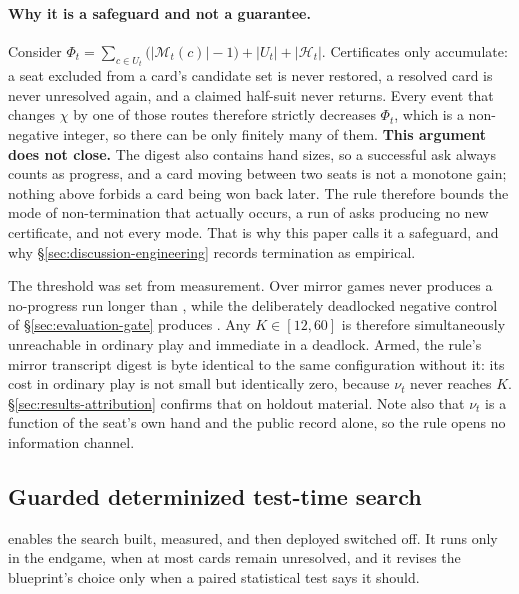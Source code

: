 \paragraph{Why it is a safeguard and not a guarantee.} Consider
$\Phi_t = \sum_{c \in U_t}\bigl(|\mathcal{M}_t(c)| - 1\bigr) + |U_t| + |\mathcal{H}_t|$. Certificates
only accumulate: a seat excluded from a card's candidate set is never restored, a resolved card is
never unresolved again, and a claimed half-suit never returns. Every event that changes $\chi$ by one
of those routes therefore strictly decreases $\Phi_t$, which is a non-negative integer, so there can be
only finitely many of them. \textbf{This argument does not close.} The digest also contains hand
sizes, so a successful ask always counts as progress, and a card moving between two seats is not a
monotone gain; nothing above forbids a card being won back later. The rule therefore bounds the mode
of non-termination that actually occurs, a run of asks producing no new certificate, and not every
mode. That is why this paper calls it a safeguard, and why \S\ref{sec:discussion-engineering} records
termination as empirical.

The threshold was set from measurement. Over \vsevenStallMirrorGames{} mirror games \vsix{} never
produces a no-progress run longer than \vsevenStallIncumbentRun{}, while the deliberately deadlocked
negative control of \S\ref{sec:evaluation-gate} produces \vsevenStallFrozenRun{}. Any
$K \in [12,60]$ is therefore simultaneously unreachable in ordinary play and immediate in a deadlock.
Armed, the rule's mirror transcript digest is byte identical to the same configuration without it:
its cost in ordinary play is not small but identically zero, because $\nu_t$ never reaches $K$.
\S\ref{sec:results-attribution} confirms that on holdout material. Note also that $\nu_t$ is a
function of the seat's own hand and the public record alone, so the rule opens no information
channel.

\subsection{Guarded determinized test-time search}
\label{sec:agent-search}

\sestina{} enables the search \vsix{} built, measured, and then deployed switched off. It runs only
in the endgame, when at most \texttt{\vsevenOptMaxq{}} cards remain unresolved, and it revises the
blueprint's choice only when a paired statistical test says it should.

